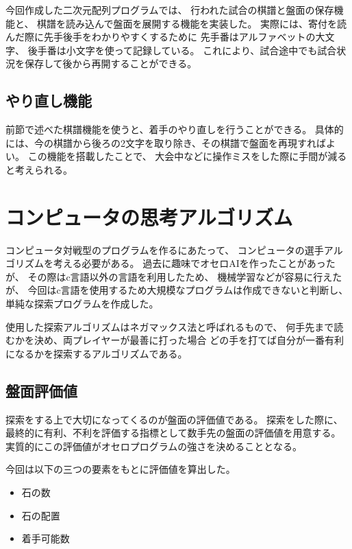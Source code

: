 \documentclass{jsarticle}
\begin{document}
        今回作成した二次元配列プログラムでは、
        行われた試合の棋譜と盤面の保存機能と、
        棋譜を読み込んで盤面を展開する機能を実装した。
        実際には、寄付を読んだ際に先手後手をわかりやすくするために
        先手番はアルファベットの大文字、
        後手番は小文字を使って記録している。
        これにより、試合途中でも試合状況を保存して後から再開することができる。

    \subsection{やり直し機能}
        前節で述べた棋譜機能を使うと、着手のやり直しを行うことができる。
        具体的には、今の棋譜から後ろの2文字を取り除き、その棋譜で盤面を再現すればよい。
        この機能を搭載したことで、
        大会中などに操作ミスをした際に手間が減ると考えられる。

\section{コンピュータの思考アルゴリズム}
    コンピュータ対戦型のプログラムを作るにあたって、
    コンピュータの選手アルゴリズムを考える必要がある。
    過去に趣味でオセロAIを作ったことがあったが、
    その際はc言語以外の言語を利用したため、
    機械学習などが容易に行えたが、
    今回はc言語を使用するため大規模なプログラムは作成できないと判断し、
    単純な探索プログラムを作成した。

    使用した探索アルゴリズムはネガマックス法と呼ばれるもので、
    何手先まで読むかを決め、両プレイヤーが最善に打った場合
    どの手を打てば自分が一番有利になるかを探索するアルゴリズムである。

    \subsection{盤面評価値}
        探索をする上で大切になってくるのが盤面の評価値である。
        探索をした際に、最終的に有利、不利を評価する指標として数手先の盤面の評価値を用意する。
        実質的にこの評価値がオセロプログラムの強さを決めることとなる。

        今回は以下の三つの要素をもとに評価値を算出した。

        \begin{itemize}
            \item 石の数
            \item 石の配置
            \item 着手可能数
        \end{itemize}
\end{document}
